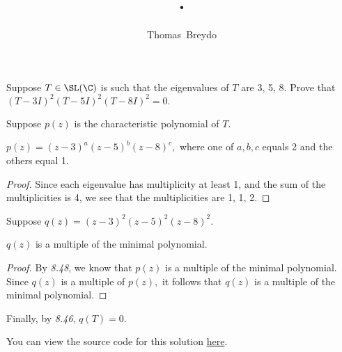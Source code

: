 \documentclass{amsart}
\title{\pagenum.\probnum}
\author{Thomas\ Breydo}
\newcommand{\pagenum}{267}
\newcommand{\probnum}{1}
\begin{document}
\maketitle

\begin{problem*}
Suppose $T\in\SL(\C)$ is such that the eigenvalues of $T$ are
3, 5, 8. Prove that $(T-3I)^2(T-5I)^2(T-8I)^2=0.$
\end{problem*}

\vspace{0.5in}

Suppose $p(z)$ is the characteristic polynomial of $T.$

\begin{claim*}
$p(z)=(z-3)^a(z-5)^b(z-8)^c,$ where one of $a,b,c$ equals 2 and the others
equal 1.
\end{claim*}
\begin{proof}
Since each eigenvalue has multiplicity at least 1, and the sum of the
multiplicities is 4, we see that the multiplicities are 1, 1, 2.
\end{proof}

Suppose $q(z)=(z-3)^2(z-5)^2(z-8)^2.$

\begin{claim*}
    $q(z)$ is a multiple of the minimal polynomial.
\end{claim*}
\begin{proof}
By \textit{8.48}, we know that $p(z)$ is a multiple of the
minimal polynomial. Since $q(z)$ is a multiple of $p(z),$
it follows that $q(z)$ is a multiple of the minimal polynomial.
\end{proof}

Finally, by \textit{8.46}, $q(T)=0.$

\vspace{0.5in}

\begin{note*}
You can view the source code for this solution
\href{https://github.com/thomasbreydo/linalg/blob/main/\pagenum_\probnum_Thomas_Breydo.tex}
{here}.
\end{note*}
\end{document}
